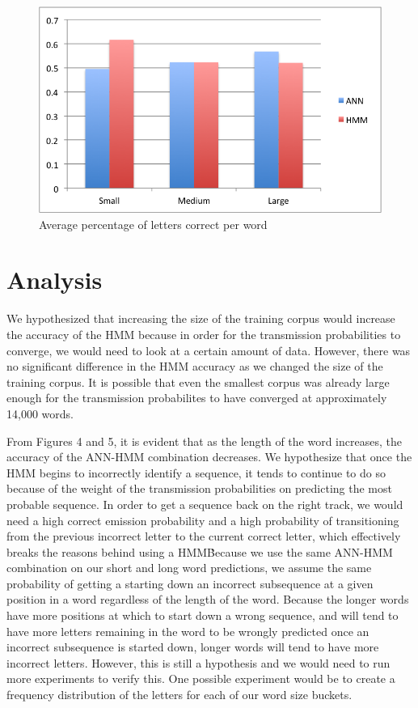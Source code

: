 \documentclass[11pt,a4paper,twocolumn]{article}
\begin{document}
\begin{figure}[h]
\centering
\caption{Average percentage of letters correct per word}
\includegraphics[scale=0.55]{img/wordCorrectness.png}
\end{figure}


\section{Analysis}

We hypothesized that increasing the size of the training corpus would increase the accuracy of the
HMM because in order for the transmission probabilities to converge, we would need to look at a
certain amount of data. However, there was no significant difference in the HMM accuracy as we
changed the size of the training corpus. It is possible that even the smallest corpus was already
large enough for the transmission probabilites to have converged at approximately 14,000 words.

From Figures 4 and 5, it is evident that as the length of the word increases, the accuracy of the
ANN-HMM combination decreases. We hypothesize that once the HMM begins to incorrectly identify a
sequence, it tends to continue to do so because of the weight of the transmission probabilities on
predicting the most probable sequence. In order to get a sequence back on the right track, we would
need a high correct emission probability and a high probability of transitioning from the previous
incorrect letter to the current correct letter, which effectively breaks the reasons behind using a
HMM\. Because we use the same ANN-HMM combination on our short and long word predictions, we assume
the same probability of getting a starting down an incorrect subsequence at a given position in a
word regardless of the length of the word. Because the longer words have more positions at which to
start down a wrong sequence, and will tend to have more letters remaining in the word to be wrongly
predicted once an incorrect subsequence is started down, longer words will tend to have more
incorrect letters. However, this is still a hypothesis and we would need to run more
experiments to verify this. One possible experiment would be to create a frequency distribution of the letters for each of our word size buckets.
\end{document}
